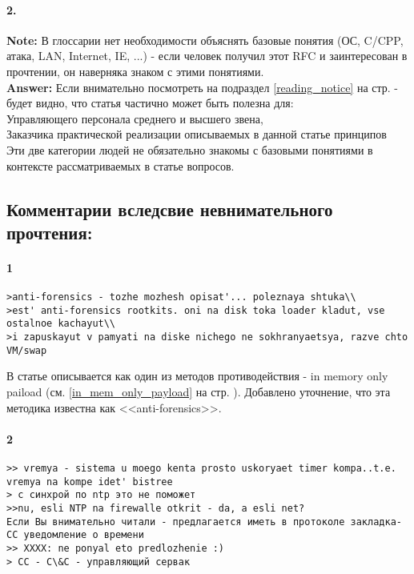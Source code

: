 \paragraph{2.\\}
{\bf Note:} В глоссарии нет необходимости объяснять базовые понятия (ОС, C/CPP, атака, LAN, Internet, IE, ...) - если человек получил этот RFC и заинтересован в прочтении, он наверняка знаком
 с этими понятиями.\\
{\bf Answer:} Если внимательно посмотреть на подраздел \ref{reading_notice} на стр. \pageref{reading_notice} - будет видно, что статья частично может быть полезна для:\\
Управляющего персонала среднего и высшего звена, \\
Заказчика практической реализации описываемых в данной статье принципов \\
Эти две категории людей не обязательно знакомы с базовыми понятиями в контексте рассматриваемых в статье вопросов.

\subsection{Комментарии вследсвие невнимательного прочтения:\\}
\label{miss_of_attention}

\paragraph{1\\}
\begin{verbatim}
>anti-forensics - tozhe mozhesh opisat'... poleznaya shtuka\\
>est' anti-forensics rootkits. oni na disk toka loader kladut, vse ostalnoe kachayut\\
>i zapuskayut v pamyati na diske nichego ne sokhranyaetsya, razve chto VM/swap
\end{verbatim}
В статье описывается как один из методов противодействия - in memory only paiload (см. \ref{in_mem_only_payload} на стр. \pageref{in_mem_only_payload}). Добавлено уточнение, что
эта методика известна как <<anti-forensics>>.

\paragraph{2\\}

\begin{verbatim}
>> vremya - sistema u moego kenta prosto uskoryaet timer kompa..t.e. vremya na kompe idet' bistree
> с синхрой по ntp это не поможет
>>nu, esli NTP na firewalle otkrit - da, a esli net?
Если Вы внимательно читали - предлагается иметь в протоколе закладка-CC уведомление о времени
>> XXXX: ne ponyal eto predlozhenie :)
> CC - C\&C - управляющий сервак
\end{verbatim}


